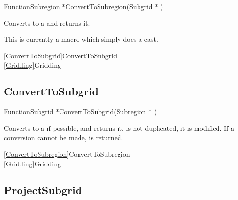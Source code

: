 
\begin{deftypefn}{Function}{Subregion *}{ConvertToSubregion}({Subgrid *} )

\DESCRIPTION
Converts  to a  and returns it.

\NOTES
This is currently a macro which simply does a cast.

\SEEALSO
\vref{ConvertToSubgrid}{ConvertToSubgrid}\\
\vref{Gridding}{Gridding}

\end{deftypefn}


\newpage
\subsection{ConvertToSubgrid}
\label{ConvertToSubgrid}


\begin{deftypefn}{Function}{Subgrid *}{ConvertToSubgrid}({Subregion *} )

\DESCRIPTION
Converts  to a  if possible,
and returns it.
 is not duplicated, it is modified.
If a conversion cannot be made,  is returned.

\SEEALSO
\vref{ConvertToSubregion}{ConvertToSubregion}\\
\vref{Gridding}{Gridding}

\end{deftypefn}


\newpage
\subsection{ProjectSubgrid}
\label{ProjectSubgrid}

